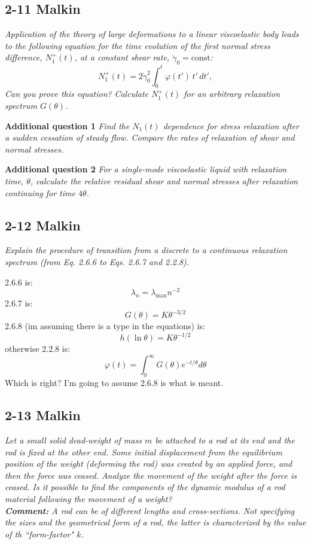 \subsection{2-11 Malkin}
\emph{Application of the theory of large deformations to a linear viscoelastic body leads to the following equation for the time evolution of the first normal stress difference, $N_1^+(t)$, at a constant shear rate, $\dot\gamma_0 = \text{const}$:}
\[
	N_1^+(t)
	= 2\dot\gamma_0^2 \int_0^t \varphi(t')\,t'\,dt',
\]
\emph{Can you prove this equation?}
\emph{Calculate $N_1^+(t)$ for an arbitrary relaxation spectrum $G(\theta)$.}

\textbf{Additional question 1} \emph{Find the $N_1(t)$ dependence for stress relaxation after a sudden cessation of steady flow.  Compare the rates of relaxation of shear and normal stresses.}

\textbf{Additional question 2} \emph{For a single-mode viscoelastic liquid with relaxation time, $\theta$, calculate the relative residual shear and normal stresses after relaxation continuing for time $4\theta$.}


\subsection{2-12 Malkin}
\textit{Explain the procedure of transition from a discrete to a continuous relaxation spectrum (from Eq. 2.6.6 to Eqs. 2.6.7 and 2.2.8).}

2.6.6 is:
\[
	\lambda_n = \lambda_\text{max}n^{-2}
\]
2.6.7 is:
\[
	G(\theta) = K\theta^{-3/2}
\]
2.6.8 (im assuming there is a type in the equations) is:
\[
	h(\ln\theta) = K \theta^{-1/2}
\]
otherwise 2.2.8 is:
\[
	\varphi(t) = \int_0^\infty G(\theta) e^{-t/\theta} d\theta
\]
Which is right? I'm going to assume 2.6.8 is what is meant.

\subsection{2-13 Malkin}
\textit{Let a small solid dead-weight of mass $m$ be attached to a rod at its end and the rod is fixed at the other end. Some initial displacement from the equilibrium position of the weight (deforming the rod) was created by an applied force, and then the force was ceased. Analyze the movement of the weight after the force is ceased. Is it possible to find the components of the dynamic modulus of a rod material following the movement of a weight?}\\
\textit{\textbf{Comment:} A rod can be of different lengths and cross-sections. Not specifying the sizes and the geometrical form of a rod, the latter is characterized by the value of th ``form-factor" $k$.}

